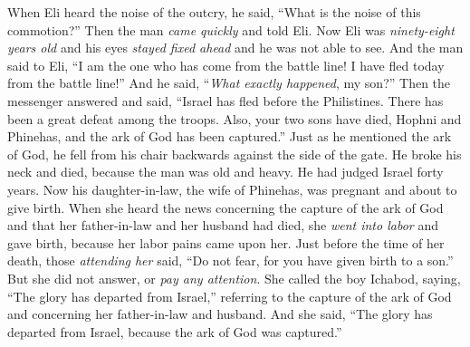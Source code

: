 \begin{biblechapter}
\verse When Eli heard the noise of the outcry, he said, “What is the noise of this commotion?” Then the man \textit{came quickly} and told Eli.
\verse Now Eli was \textit{ninety-eight years old} and his eyes \textit{stayed fixed ahead} and he was not able to see.
\verse And the man said to Eli, “I am the one who has come from the battle line! I have fled today from the battle line!” And he said, “\textit{What exactly happened}, my son?”
\verse Then the messenger answered and said, “Israel has fled before the Philistines. There has been a great defeat among the troops. Also, your two sons have died, Hophni and Phinehas, and the ark of God has been captured.”
\verse Just as he mentioned the ark of God, he fell from his chair backwards against the side of the gate. He broke his neck and died, because the man was old and heavy. He had judged Israel forty years.
\verse Now his daughter-in-law, the wife of Phinehas, was pregnant and about to give birth. When she heard the news concerning the capture of the ark of God and that her father-in-law and her husband had died, she \textit{went into labor} and gave birth, because her labor pains came upon her.
\verse Just before the time of her death, those \textit{attending her} said, “Do not fear, for you have given birth to a son.” But she did not answer, or \textit{pay any attention}.
\verse She called the boy Ichabod, saying, “The glory has departed from Israel,” referring to the capture of the ark of God and concerning her father-in-law and husband.
\verse And she said, “The glory has departed from Israel, because the ark of God was captured.”
\end{biblechapter}

